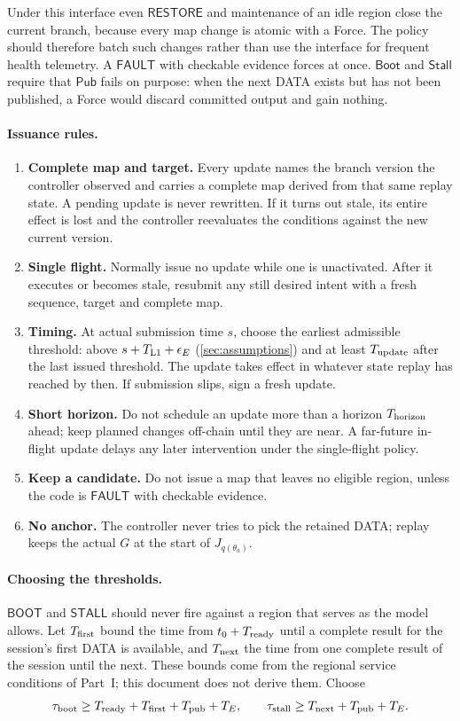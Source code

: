 \documentclass[11pt,a4paper]{article}
\newcommand{\tagg}[1]{\ensuremath{\mathsf{#1}}}
\begin{document}
Under this interface even \tagg{RESTORE} and maintenance of an idle
region close the current branch, because every map change is atomic with
a Force. The policy should therefore batch such changes rather than use
the interface for frequent health telemetry. A \tagg{FAULT} with
checkable evidence forces at once. $\tagg{Boot}$ and
$\tagg{Stall}$ require that $\tagg{Pub}$ fails on purpose: when the next
DATA exists but has not been published, a Force would discard committed
output and gain nothing.

\paragraph{Issuance rules.}
\begin{enumerate}[label=(R\arabic*)]
\item \textbf{Complete map and target.} Every update names the branch
version the controller observed and carries a complete map derived from
that same replay state. A pending update is never rewritten. If it turns
out stale, its entire effect is lost and the controller reevaluates the
conditions against the new current version.
\item \textbf{Single flight.} Normally issue no update while one is
unactivated. After it executes or becomes stale, resubmit any still
desired intent with a fresh sequence, target and complete map.
\item \textbf{Timing.} At actual submission time $s$, choose the
earliest admissible threshold: above $s+T_{\rm L1}+\epsilon_E$
(\cref{sec:assumptions}) and at least $T_{\rm update}$ after the last
issued threshold. The update takes effect in whatever state replay has
reached by then. If submission slips, sign a fresh update.
\item \textbf{Short horizon.} Do not schedule an update more than a
horizon $T_{\rm horizon}$ ahead; keep planned changes off-chain until they are near.
A far-future in-flight update delays any later intervention under the
single-flight policy.
\item \textbf{Keep a candidate.} Do not issue a map that leaves no
eligible region, unless the code is \tagg{FAULT} with checkable
evidence.
\item \textbf{No anchor.} The controller never tries to pick the
retained DATA; replay keeps the actual $G$ at the start of
$J_{q(\theta_a)}$.
\end{enumerate}

\paragraph{Choosing the thresholds.}
\tagg{BOOT} and \tagg{STALL} should never fire against a region that
serves as the model allows. Let $T_{\rm first}$ bound the time from
$t_0+T_{\rm ready}$ until a complete result for the session's first DATA
is available, and $T_{\rm next}$ the time from one complete result of
the session until the next. These bounds come from the regional service
conditions of Part~I; this document does not derive them. Choose
\[
 \tau_{\rm boot}\ge T_{\rm ready}+T_{\rm first}+T_{\rm pub}+T_E,
 \qquad
 \tau_{\rm stall}\ge T_{\rm next}+T_{\rm pub}+T_E.
\]
\end{document}
